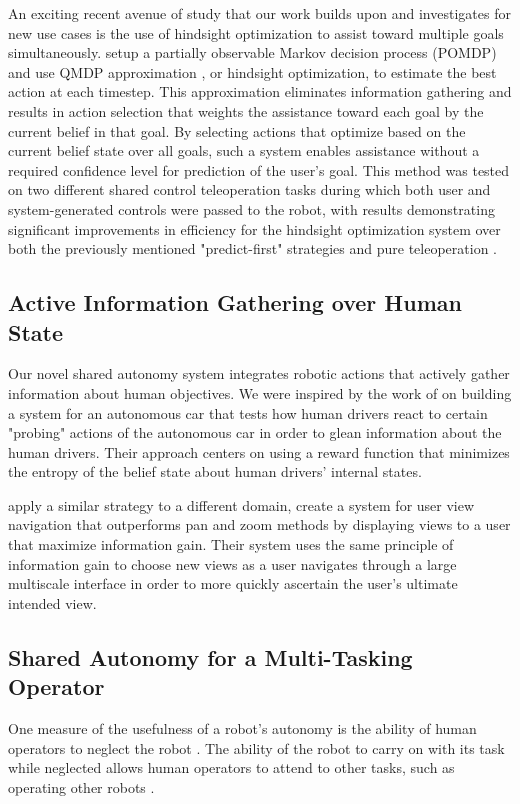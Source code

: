 \documentclass[conference]{IEEEtran}
\begin{document}
An exciting recent avenue of study that our work builds upon and investigates for new use cases is the use of hindsight optimization to assist toward multiple goals simultaneously. \citet{javdani2015shared} setup a partially observable Markov decision process (POMDP) and use QMDP approximation \cite{littman1995learning}, or hindsight optimization, to estimate the best action at each timestep. This approximation eliminates information gathering and results in action selection that weights the assistance toward each goal by the current belief in that goal. By selecting actions that optimize based on the current belief state over all goals, such a system enables assistance without a required confidence level for prediction of the user's goal. This method was tested on two different shared control teleoperation tasks during which both user and system-generated controls were passed to the robot, with results demonstrating significant improvements in efficiency for the hindsight optimization system over both the previously mentioned "predict-first" strategies and pure teleoperation \cite{javdani2018shared}.

\subsection{Active Information Gathering over Human State}
Our novel shared autonomy system integrates robotic actions that actively gather information about human objectives. We were inspired by the work of \citet{sadigh2016information} on building a system for an autonomous car that tests how human drivers react to certain "probing" actions of the autonomous car in order to glean information about the human drivers. Their approach centers on using a reward function that minimizes the entropy of the belief state about human drivers' internal states.

\citet{liu2017bignav} apply a similar strategy to a different domain, create a system for user view navigation that outperforms pan and zoom methods by displaying views to a user that maximize information gain. Their system uses the same principle of information gain to choose new views as a user navigates through a large multiscale interface in order to more quickly ascertain the user's ultimate intended view.

\subsection{Shared Autonomy for a Multi-Tasking Operator}
One measure of the usefulness of a robot's autonomy is the ability of human operators to neglect the robot \cite{crandall2002characterizing, olsen2003metrics}. The ability of the robot to carry on with its task while neglected allows human operators to attend to other tasks, such as operating other robots \cite{crandall2005validating, cummings2008predicting}.
\end{document}
